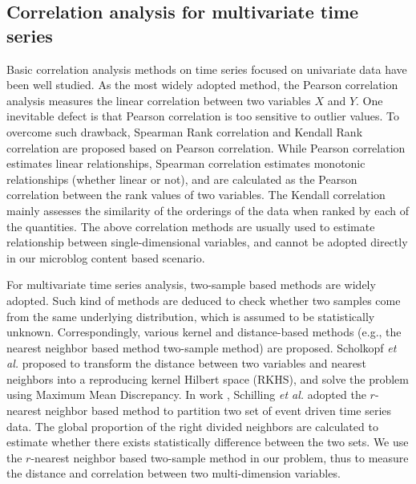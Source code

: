 \subsection{Correlation analysis for multivariate time series}
Basic correlation analysis methods on time series focused on univariate data have been well studied.
As the most widely adopted method,
the Pearson correlation analysis \cite{Cohen1988Statistical} measures the linear correlation between two variables $X$ and $Y$.
One inevitable defect is that Pearson correlation is too sensitive to outlier values.
To overcome such drawback,
Spearman Rank correlation \cite{C1987The}
and Kendall Rank correlation \cite{Mcleod2011Kendall}
are proposed based on Pearson correlation.
While Pearson correlation estimates linear relationships,
Spearman correlation estimates monotonic relationships (whether linear or not),
and are calculated as the Pearson correlation between the rank values of two variables.
The Kendall correlation mainly assesses the similarity of the orderings of the data when ranked by each of the quantities.
The above correlation methods are usually used to estimate relationship between single-dimensional variables,
and cannot be adopted directly in our microblog content based scenario.

For multivariate time series analysis, two-sample based methods are widely adopted.
Such kind of methods are deduced to check whether two samples come from the same underlying distribution, which is assumed to be statistically unknown.
Correspondingly, various kernel
\cite{Sch2006A} and distance-based methods \cite{Schilling1986Multivariate}
(e.g., the nearest neighbor based method two-sample method) are proposed.
Scholkopf \emph{et al.} \cite{Sch2006A} proposed to transform the distance between two variables and nearest neighbors into a reproducing kernel Hilbert space (RKHS), and solve the problem using Maximum Mean Discrepancy.
In work \cite{Schilling1986Multivariate},
Schilling \emph{et al.} adopted the $r$-nearest neighbor based method to partition two set of event driven time series data.
The global proportion of the right divided neighbors are calculated to estimate whether there exists statistically difference between the two sets.
We use the $r$-nearest neighbor based two-sample method in our problem, thus to measure the distance and correlation between two multi-dimension variables.
